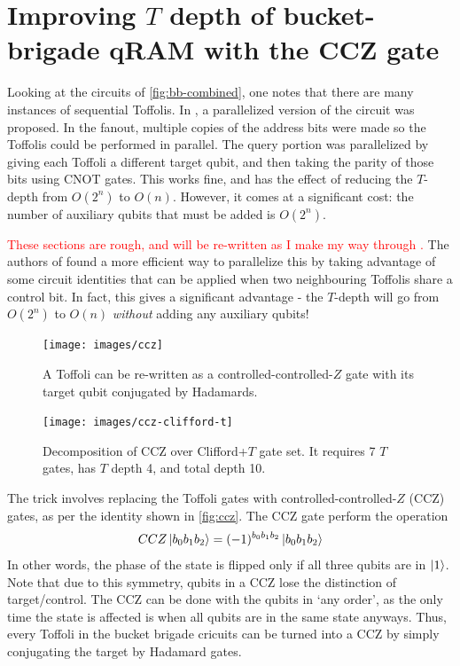 \documentclass[a4paper,12pt]{article}
\newcommand\todo[1]{\textcolor{red}{#1}}
\begin{document}



\appendix


\section{Improving $T$ depth of bucket-brigade qRAM with the CCZ gate}

Looking at the circuits of \autoref{fig:bb-combined}, one notes that there are many instances of sequential Toffolis. 
In \cite{DiMatteo2020}, a parallelized version of the circuit was proposed. 
In the fanout, multiple copies of the address bits were made so the Toffolis could be performed in parallel. 
The query portion was parallelized by giving each Toffoli a different target qubit, and then taking the parity of those bits using CNOT gates. 
This works fine, and has the effect of reducing the $T$-depth from $O(2^n)$ to $O(n)$. 
However, it comes at a significant cost: the number of auxiliary qubits that must be added is $O(2^n)$.

\todo{These sections are rough, and will be re-written as I make my way through \cite{Alexandru2020}.}
The authors of \cite{Alexandru2020} found a more efficient way to parallelize this by taking advantage of some circuit identities that can be applied when two neighbouring Toffolis share a control bit. 
In fact, this gives a significant advantage - the $T$-depth will go from $O(2^n)$ to $O(n)$ \emph{without} adding any auxiliary qubits!

\begin{figure}[ht]
 \centering 
 \captionsetup{width=.89\linewidth}
 \texttt{[image: images/ccz]}
 \caption{A Toffoli can be re-written as a controlled-controlled-$Z$ gate with its target qubit conjugated by Hadamards.}
 \label{fig:ccz}
\end{figure}

\begin{figure}[ht]
 \centering
  \captionsetup{width=.89\linewidth}
 \texttt{[image: images/ccz-clifford-t]}
 \caption{Decomposition of CCZ over Clifford+$T$ gate set. It requires 7 $T$ gates, has $T$ depth 4, and total depth 10.}
 \label{fig:ccz-clifford-t}
\end{figure}

The trick involves replacing the Toffoli gates with controlled-controlled-$Z$ (CCZ) gates, as per the identity shown in \autoref{fig:ccz}. The CCZ gate perform the operation
\begin{equation}
 CCZ \ket{b_0 b_1 b_2} = (-1)^{b_0 b_1 b_2} \ket{b_0 b_1 b_2}
\end{equation}
In other words, the phase of the state is flipped only if all three qubits are in $\ket{1}$. Note that due to this symmetry, qubits in a CCZ lose the distinction of target/control. 
The CCZ can be done with the qubits in `any order', as the only time the state is affected is when all qubits are in the same state anyways.
Thus, every Toffoli in the bucket brigade cricuits can be turned into a CCZ by simply conjugating the target by Hadamard gates. 
\end{document}
